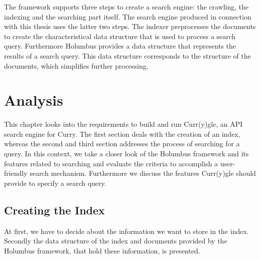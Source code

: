\documentclass[%
	pdftex,%
	a4paper,%
	oneside,%
	chapterprefix,%
	headsepline,%
	12pt%
]{scrbook}
\begin{document}
The framework supports three steps to create a search engine: the
crawling, the indexing and the searching part itself. The search
engine produced in connection with this thesis uses the latter two steps. The
indexer preprocesses the documents to create the characteristical data
structure that is used to process a search query. Furthermore Holumbus
provides a data structure that represents the results of a search
query. This data structure corresponds to the structure of the
documents, which simplifies further processing.\\


\chapter{Analysis}\label{analysis}
This chapter looks into the requirements to build and run Curr(y)gle,
an API search engine for Curry. The first section deals with the
creation of an index, whereas the second and third section addresses
the process of searching for a query. In this context, we take a
closer look of the Holumbus framework and its features related to
searching and evaluate the criteria to accomplish a user-friendly
search mechanism. Furthermore we discuss the features Curr(y)gle
should provide to specify a search query. %




\section{Creating the Index}
At first, we have to decide about the information we want to store in
the index. Secondly the data structure of the index and documents
provided by the Holumbus framework, that hold
these information, is presented.\\
\end{document}
